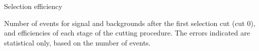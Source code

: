 \begin{frame}{Selection efficiency}
\vspace{-.2cm}
    \begin{block}{}
      \tiny \centering Number of events for signal and backgrounds after the first selection cut (cut 0), and efficiencies of each stage of the cutting procedure. The errors indicated are statistical only, based on the number of events.
    \end{block}

\end{frame}

%
%
